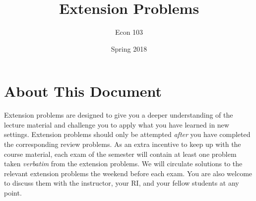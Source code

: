\documentclass[addpoints,12pt]{exam}\usepackage[]{graphicx}\usepackage[]{color}
\title{Extension Problems}
\author{Econ 103}
\date{Spring 2018}
\begin{document}
\maketitle



\section*{About This Document}
Extension problems are designed to give you a deeper understanding of the lecture material and challenge you to apply what you have learned in new settings.
Extension problems should only be attempted \emph{after} you have completed the corresponding review problems.
As an extra incentive to keep up with the course material, each exam of the semester will contain at least one problem taken \emph{verbatim} from the extension problems. 
We will circulate solutions to the relevant extension problems the weekend before each exam.
You are also welcome to discuss them with the instructor, your RI, and your fellow students at any point.



\end{document}

